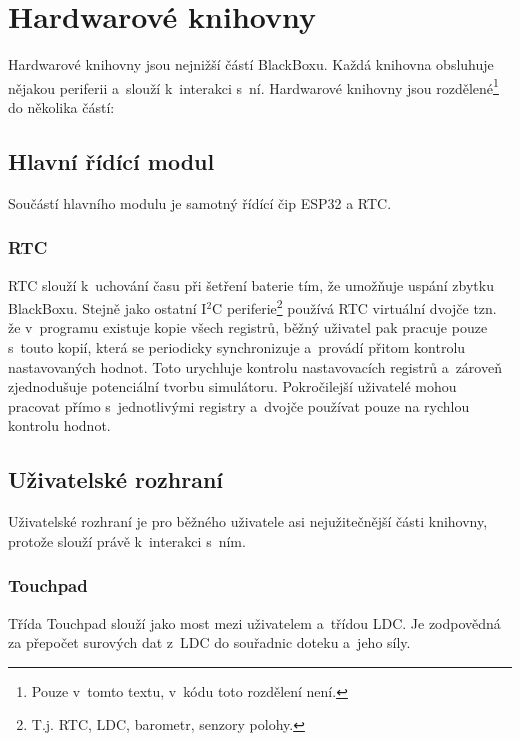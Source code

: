\chapter{Hardwarové knihovny}
Hardwarové knihovny jsou nejnižší částí BlackBoxu.
Každá knihovna obsluhuje nějakou periferii a~slouží k~interakci s~ní.
Hardwarové knihovny jsou rozdělené\footnote{Pouze v~tomto textu, v~kódu toto rozdělení není.} do několika částí:

\section{Hlavní řídící modul}

Součástí hlavního modulu je samotný řídící čip ESP32 a RTC.

\subsection{RTC}\label{ss:rtc}

RTC slouží k~uchování času při šetření baterie tím, že umožňuje uspání zbytku BlackBoxu.
Stejně jako ostatní I$^2$C periferie\footnote{T.j. RTC, LDC, barometr, senzory polohy.} používá RTC virtuální dvojče tzn. že v~programu existuje kopie všech registrů, běžný uživatel pak pracuje pouze s~touto kopií, která se periodicky synchronizuje a~provádí přitom kontrolu nastavovaných hodnot.
Toto urychluje kontrolu nastavovacích registrů a~zároveň zjednodušuje potenciální tvorbu simulátoru.
Pokročilejší uživatelé mohou pracovat přímo s~jednotlivými registry a~dvojče používat pouze na rychlou kontrolu hodnot.

\section{Uživatelské rozhraní}

Uživatelské rozhraní je pro běžného uživatele asi nejužitečnější části knihovny, protože slouží právě k~interakci s~ním.

\subsection{Touchpad}

Třída Touchpad slouží jako most mezi uživatelem a~třídou LDC.
Je zodpovědná za přepočet surových dat z~LDC do souřadnic doteku a~jeho síly.

